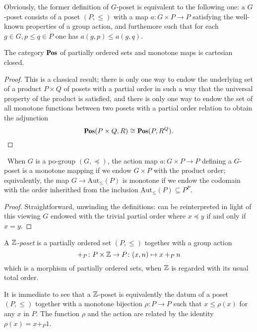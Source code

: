 \documentclass[a4paper,12pt]{amsart}
\begin{document}
\begin{remark}
Obviously, the former definition of $G$-poset is equivalent to the following one: a $G$-poset consists of a poset $(P,\le)$ with a map $a\colon G\times P\to P$ satisfying the well-known properties of a group action, and furthemore such that for each $g\in G, p\le q\in P$ one has $a(g,p)\le a(g,q)$.
\end{remark}
\begin{lemma}
The category $\cate{Pos}$ of partially ordered sets and monotone maps is cartesian closed.
\end{lemma}
\begin{proof}
This is a classical result; there is only one way to endow the underlying set of a product $P\times Q$ of posets with a partial order in such a way that the universal property of the product is satisfied, and there is only one way to endow the set of all monotone functions between two posets with a partial order relation to obtain the adjunction
\[
\cate{Pos}(P\times Q, R)\cong \cate{Pos}(P, R^Q).\qedhere
\]
\end{proof}
\begin{proposition}\
When $G$ is a po-group $(G, \preceq)$, the action map $a\colon G\times P\to P$ defining a $G$-poset is a monotone mapping if we endow $G\times P$ with the product order; equivalently, the map $G\to \text{Aut}_\le(P)$ is monotone if we endow the codomain with the order inherithed from the inclusion $\text{Aut}_\le(P)\subseteq  P^P$.
\end{proposition}
\begin{proof}
Straightforward, unwinding the definitions: \adef {} can be reinterpreted in light of this viewing $G$ endowed with the trivial partial order where $x\preceq y$ if and only if $x=y$.
\end{proof}
\begin{definition}\label{zposet}
A \emph{$\mathbb{Z} $-poset} is a partially ordered set $(P,\leq)$ together with a group action 
\[
+_P\colon P\times \mathbb{Z} \to P \colon (x,n) \mapsto x+_Pn 
\]
 which is a morphism of partially ordered sets, when $\mathbb{Z} $ is regarded with its usual total order.
\end{definition}
\begin{remark}\label{trivial.but.useful}
It is immediate to see that a $\mathbb{Z} $-poset is equivalently the datum of a poset $(P,\leq)$ together with a monotone bijection $\rho\colon P\to P$ such that $x\leq \rho(x)$ for any $x$ in $P$. The function $\rho$ and the action are related by the identity $\rho(x)=x+_P1$.
\end{remark}
\end{document}
